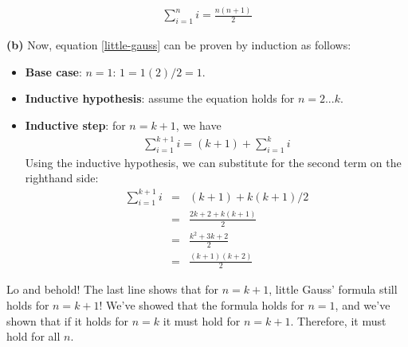 \documentclass[a4paper, 11pt]{article}
\renewcommand{\part}[1] {\vspace{.10in} {\bf (#1)}}
\begin{document}
\begin{eqnarray}
\sum_{i=1}^n i = {\frac{n(n+1)}2}  %
\label{little-gauss}        %
\end{eqnarray}

\part{b} Now, equation \ref{little-gauss} can be proven by induction as
follows:

\begin{itemize}
\item {\bf Base case}: $n=1$: $1 = 1(2)/2=1$.
\item {\bf Inductive hypothesis}: assume the equation holds for $n=2...k$.
\item {\bf Inductive step}: for $n=k+1$, we have
\begin{eqnarray*}    %
\sum_{i=1}^{k+1} i = (k+1) + \sum_{i=1}^k i
\end{eqnarray*}
Using the inductive hypothesis, we can substitute for the second term
on the righthand side:
\begin{eqnarray*}
\sum_{i=1}^{k+1} i &=& (k+1) + k(k+1)/2\\    
                   &=& {\frac{{2k+2 + k(k+1)}}2}\\
                   &=& {\frac{{k^2 + 3k + 2}}2}\\
                   &=& {\frac{(k+1)(k+2)}2}
\end{eqnarray*}
\end{itemize}

Lo and behold! The last line shows that for $n=k+1$, little Gauss'
formula still holds for $n=k+1$! We've showed that the formula holds
for $n=1$, and we've shown that if it holds for $n=k$ it must hold for
$n=k+1$. Therefore, it must hold for all $n$.
\end{document}
